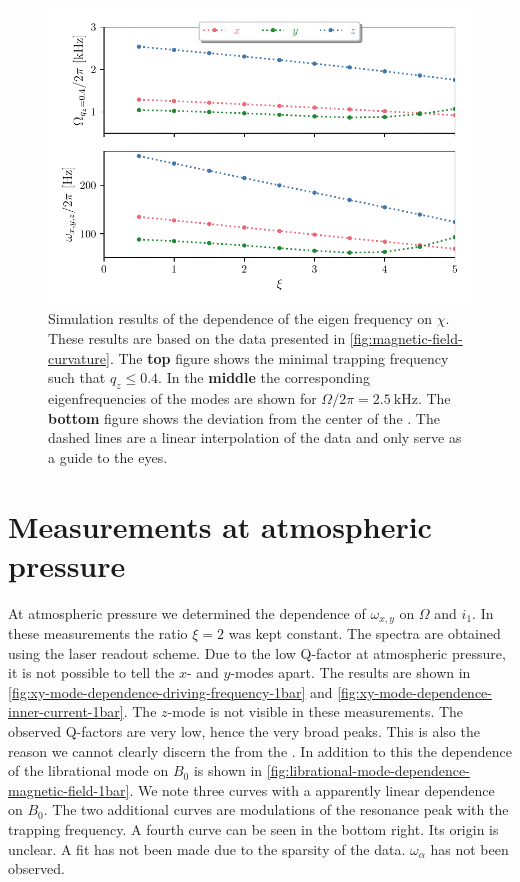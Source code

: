 \begin{figure}
    \centering
    \includegraphics{figures/data/eigen_frequency_xi_dependence.pdf}
    \caption{Simulation results of the dependence of the eigen frequency on $\chi$. These results are based on the data presented in \autoref{fig:magnetic-field-curvature}. The \textbf{top} figure shows the minimal trapping frequency such that $q_z \leq 0.4$. In the \textbf{middle} the corresponding eigenfrequencies of the modes are shown for $\Omega / 2\pi = \qty{2.5}{\kilo\hertz}$. The \textbf{bottom} figure shows the deviation from the center of the \ymode. The dashed lines are a linear interpolation of the data and only serve as a guide to the eyes.}
    \label{fig:eigen-frequency-xi-dependence}
\end{figure}

\section{Measurements at atmospheric pressure}
\label{sec:measurements-at-atmospheric-pressure}
At atmospheric pressure we determined the dependence of $\omega_{x,y}$ on $\Omega$ and $i_1$. In these measurements the ratio $\xi=2$ was kept constant. The spectra are obtained using the laser readout scheme. Due to the low Q-factor at atmospheric pressure, it is not possible to tell the $x$- and $y$-modes apart. The results are shown in \autoref{fig:xy-mode-dependence-driving-frequency-1bar} and \autoref{fig:xy-mode-dependence-inner-current-1bar}. The $z$-mode is not visible in these measurements. The observed Q-factors are very low, hence the very broad peaks. This is also the reason we cannot clearly discern the \xmode from the \ymode. In addition to this the dependence of the librational mode on $B_0$ is shown in \autoref{fig:librational-mode-dependence-magnetic-field-1bar}. We note three curves with a apparently linear dependence on $B_0$. The two additional curves are modulations of the resonance peak with the trapping frequency. A fourth curve can be seen in the bottom right. Its origin is unclear. A fit has not been made due to the sparsity of the data. $\omega_\alpha$ has not been observed.

